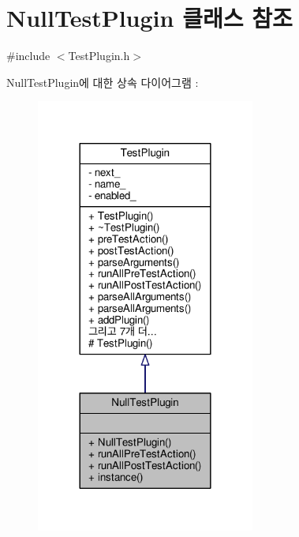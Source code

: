 \hypertarget{class_null_test_plugin}{}\section{Null\+Test\+Plugin 클래스 참조}
\label{class_null_test_plugin}


{\ttfamily \#include $<$Test\+Plugin.\+h$>$}



Null\+Test\+Plugin에 대한 상속 다이어그램 \+: 
\nopagebreak
\begin{figure}[H]
\begin{center}
\leavevmode
\includegraphics[width=204pt]{class_null_test_plugin__inherit__graph}
\end{center}
\end{figure}


